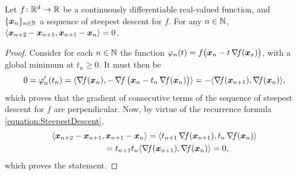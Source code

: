 \begin{theorem}\label{theorem:SteepestDescentPerpSteps}
Let $f \colon \mathbb{R}^d \to \mathbb{R}$ be a continuously differentiable real-valued function, and $\{ \boldsymbol{x}_n \}_{n\in\mathbb{N}}$ a sequence of steepest descent for $f$.  For any $n \in \mathbb{N}$, $\langle \boldsymbol{x}_{n+2} - \boldsymbol{x}_{n+1}, \boldsymbol{x}_{n+1} - \boldsymbol{x}_n \rangle = 0$.
\end{theorem}
\begin{proof}
Consider for each $n \in \mathbb{N}$ the function $\varphi_n(t) = f\big(\boldsymbol{x}_n -t \mathop{\nabla\! {f}}(\boldsymbol{x}_x)\big)$, with a global minimum at $t_n \geq 0$.  It must then be
\begin{equation*}
0 = \varphi_n'(t_n) = \langle \mathop{\nabla\! {f}}(\boldsymbol{x}_n), -\mathop{\nabla\! {f}}\big( \boldsymbol{x}_n - t_n \mathop{\nabla\! {f}}(\boldsymbol{x}_n)\big) \rangle = - \langle \mathop{\nabla\! {f}}(\boldsymbol{x}_{n+1}), \mathop{\nabla\! {f}}(\boldsymbol{x}_n) \rangle,
\end{equation*}
which proves that the gradient of consecutive terms of the sequence of steepest descent for $f$ are perpendicular.  Now, by virtue of the recurrence formula \eqref{equation:SteepestDescent},
\begin{align*}
\langle \boldsymbol{x}_{n+2} - \boldsymbol{x}_{n+1}, &\,\boldsymbol{x}_{n+1} - \boldsymbol{x}_n \rangle = \langle t_{n+1}\mathop{\nabla\! {f}}(\boldsymbol{x}_{n+1}), t_n \mathop{\nabla\! {f}}(\boldsymbol{x}_n) \rangle \\
&= t_{n+1}t_n \langle \mathop{\nabla\! {f}}(\boldsymbol{x}_{n+1}), \mathop{\nabla\! {f}}(\boldsymbol{x}_n) \rangle = 0, 
\end{align*}
which proves the statement.
\end{proof}

